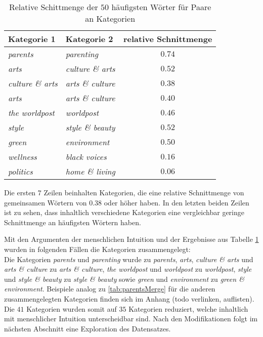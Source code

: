 \documentclass[a4paper,11pt]{article}
\begin{document}
\begin{table}[ht]
\begin{center}
\begin{tabular}{|l|l|c|}
  \hline
Kategorie 1 & Kategorie 2  & relative Schnittmenge \\ 
  \hline
\textit{parents} & \textit{parenting} & $0.74$ \\
\textit{arts} & \textit{culture \& arts} & $0.52$\\
\textit{culture \& arts} & \textit{arts \& culture} &  $0.38$\\
\textit{arts} & \textit{arts \& culture}  & $0.40$\\
\textit{the worldpost} & \textit{worldpost} & $0.46$ \\
\textit{style} & \textit{style \& beauty} & $0.52$ \\
\textit{green} & \textit{environment} & $0.50$ \\
\hline
\textit{wellness} & \textit{black voices} & $0.16$ \\
\textit{politics} & \textit{home \& living} & $0.06$ \\
   \hline
\end{tabular}
\label{tab:categoryMerge}
\caption{Relative Schittmenge der $50$ häufigsten Wörter für Paare an Kategorien}
\end{center}
\end{table}

Die ersten $7$ Zeilen beinhalten Kategorien, die eine relative Schnittmenge von gemeinsamen Wörtern von $0.38$ oder höher haben. In den letzten beiden Zeilen ist zu sehen, dass inhaltlich verschiedene Kategorien eine vergleichbar geringe Schnittmenge an häufigsten Wörtern haben.

Mit den Argumenten der menschlichen Intuition und der Ergebnisse aus Tabelle \ref{tab:categoryMerge} wurden in folgenden Fällen die Kategorien zusammengelegt: \\
Die Kategorien \textit{parents} und \textit{parenting} wurde zu \textit{parents}, \textit{arts}, \textit{culture \& arts} und \textit{arts \& culture} zu \textit{arts \& culture}, \textit{the worldpost} und \textit{worldpost} zu \textit{worldpost}, \textit{style} und \textit{style \& beauty} zu \textit{style \& beauty} sowie \textit{green} und \textit{environment} zu \textit{green \& environment}. Beispiele analog zu \ref{tab:parentsMerge} für die anderen zusammengelegten Kategorien finden sich im Anhang (todo verlinken, auflisten). Die $41$ Kategorien wurden somit auf $35$ Kategorien reduziert, welche inhaltlich mit menschlicher Intuition unterscheidbar sind. Nach den Modifikationen folgt im nächsten Abschnitt eine Exploration des Datensatzes.
\end{document}
